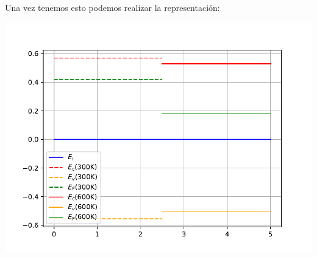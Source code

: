 	Una vez tenemos esto podemos realizar la representación:
	\begin{center}
		\includegraphics[width=0.9\linewidth]{Cuerpo/Ch_01/Ejercicio_01_7.pdf}
	\end{center}
